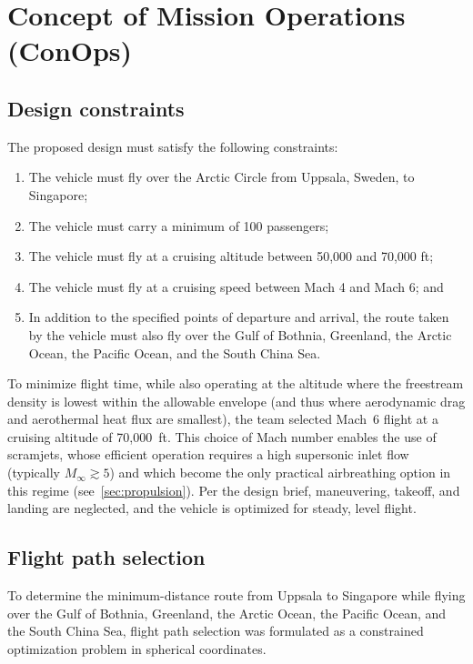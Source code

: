 \documentclass[10pt,a4paper]{article}
\begin{document}
\section{Concept of Mission Operations (ConOps)}\label{sec:conops}
\subsection{Design constraints}\label{sec:constraints}
The proposed design must satisfy the following constraints:
\begin{enumerate}[label=\roman*.,noitemsep]
    \item The vehicle must fly over the Arctic Circle from Uppsala, Sweden, to Singapore;
    \item The vehicle must carry a minimum of 100 passengers;
    \item The vehicle must fly at a cruising altitude between 50,000 and 70,000 ft;
    \item The vehicle must fly at a cruising speed between Mach 4 and Mach 6; and
    \item In addition to the specified points of departure and arrival, the route taken by the vehicle must also fly over the Gulf of Bothnia, Greenland, the Arctic Ocean, the Pacific Ocean, and the South China Sea.
\end{enumerate}

To minimize flight time, while also operating at the altitude where the freestream density is lowest within the allowable envelope (and thus where aerodynamic drag and aerothermal heat flux are smallest), the team selected Mach~6 flight at a cruising altitude of 70,000~ft. This choice of Mach number enables the use of scramjets, whose efficient operation requires a high supersonic inlet flow (typically $M_\infty \gtrsim 5$) and which become the only practical airbreathing option in this regime (see~\cref{sec:propulsion}). Per the design brief, maneuvering, takeoff, and landing are neglected, and the vehicle is optimized for steady, level flight.

\subsection{Flight path selection}\label{sec:trajectory}

To determine the minimum-distance route from Uppsala to Singapore while flying over the Gulf of Bothnia, Greenland, the Arctic Ocean, the Pacific Ocean, and the South China Sea, flight path selection was formulated as a constrained optimization problem in spherical coordinates.
\end{document}
